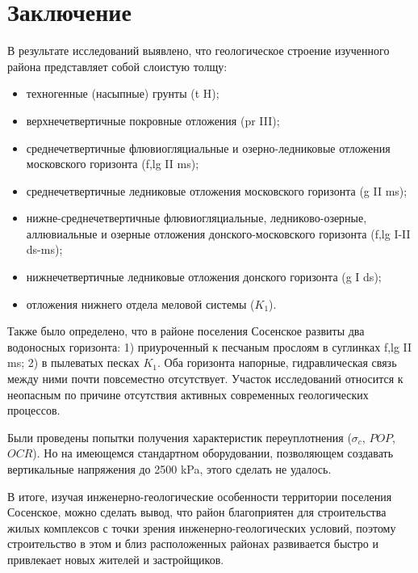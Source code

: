 \chapter{Заключение}\label{ch:ch8}

В результате исследований выявлено, что геологическое строение 
изученного района представляет собой слоистую толщу:

\begin{itemize}
    \item техногенные (насыпные) грунты (t H);
    \item верхнечетвертичные покровные отложения (pr III);
    \item среднечетвертичные флювиогляциальные и озерно-ледниковые отложения московского горизонта (f,lg II ms);
    \item среднечетвертичные ледниковые отложения московского горизонта (g II ms);
    \item нижне-среднечетвертичные флювиогляциальные, ледниково-озерные, аллювиальные и озерные отложения донского-московского горизонта (f,lg I-II ds-ms);
    \item нижнечетвертичные ледниковые отложения донского горизонта (g I ds);
    \item отложения нижнего отдела меловой системы ($K_1$).
\end{itemize}

Также было определено, что в районе поселения Сосенское развиты два водоносных горизонта: 
1) приуроченный к песчаным прослоям в суглинках f,lg II ms; 2) в пылеватых песках $K_1$. 
Оба горизонта напорные, гидравлическая связь между ними почти повсеместно отсутствует.
Участок исследований относится к неопасным по причине отсутствия активных современных 
геологических процессов.

Были проведены попытки получения характеристик переуплотнения ($\sigma_c$, $POP$, $OCR$). 
Но на имеющемся стандартном оборудовании, позволяющем создавать вертикальные 
напряжения до 2500 \si{\kilo\Pa}, этого сделать не удалось.

В итоге, изучая инженерно-геологические особенности территории поселения Сосенское, 
можно сделать вывод, что район благоприятен для строительства жилых комплексов 
с точки зрения инженерно-геологических условий, поэтому строительство в этом и близ 
расположенных районах развивается быстро и привлекает новых жителей и застройщиков.